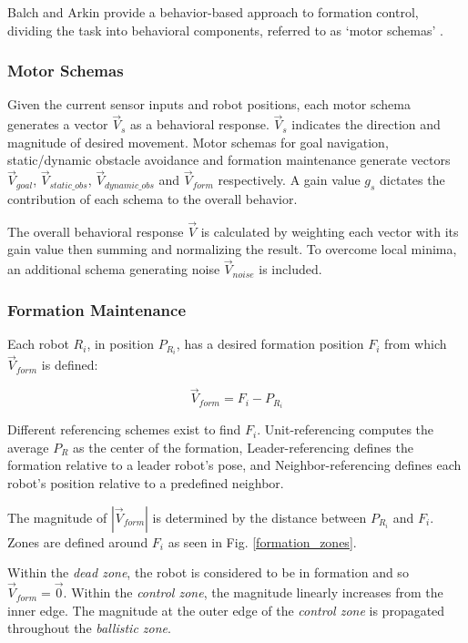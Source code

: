\documentclass[letterpaper, 10 pt, conference]{ieeeconf}  %
\begin{document}
Balch and Arkin provide a behavior-based approach to formation control, dividing the task into behavioral components, referred to as `motor schemas' \cite{c2}. 

\subsubsection*{Motor Schemas}

Given the current sensor inputs and robot positions, each motor schema generates a vector $\vec{V}_s$ as a behavioral response. $\vec{V}_s$ indicates the direction and magnitude of desired movement. Motor schemas for goal navigation, static/dynamic obstacle avoidance and formation maintenance generate vectors $\vec{V}_{goal}$, $\vec{V}_{static\_obs}$, $\vec{V}_{dynamic\_obs}$ and $\vec{V}_{form}$ respectively. A gain value $g_s$ dictates the contribution of each schema to the overall behavior.

The overall behavioral response $\vec{V}$ is calculated by weighting each vector with its gain value then summing and normalizing the result. To overcome local minima, an additional schema generating noise  $\vec{V}_{noise}$ is included.

\subsubsection*{Formation Maintenance}
Each robot $R_i$, in position $P_{R_i}$, has a desired formation position $F_i$ from which $\vec{V}_{form}$ is defined:

\[\vec{V}_{form} = F_i - P_{R_i}\]

Different referencing schemes exist to find $F_i$. Unit-referencing computes the average $P_R$ as the center of the formation, Leader-referencing defines the formation relative to a leader robot's pose, and Neighbor-referencing defines each robot's position relative to a predefined neighbor.

The magnitude of $|\vec{V}_{form}|$ is determined by the distance between $P_{R_i}$ and $F_i$. Zones are defined around $F_{i}$ as seen in Fig. \ref{formation_zones}. 

Within the \textit{dead zone}, the robot is considered to be in formation and so $\vec{V}_{form} = \vec{0}$. Within the \textit{control zone}, the magnitude linearly increases from the inner edge. The magnitude at the outer edge of the \textit{control zone} is propagated throughout the \textit{ballistic zone}.
\end{document}
